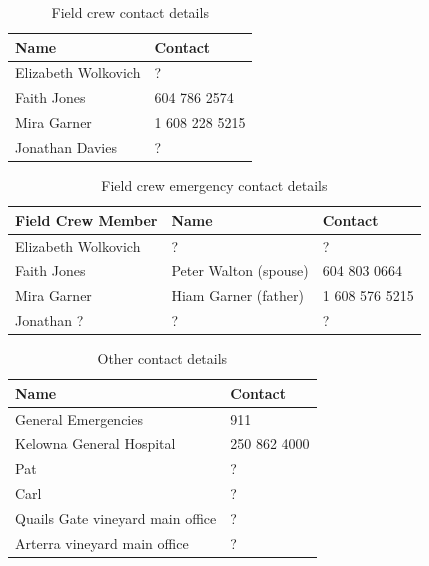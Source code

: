 \documentclass[11pt,letter]{article}
\begin{document}
\begin{table}[H]
\caption{Field crew contact details} %
\begin{tabular}{ l | l }  %
\hline\hline %
Name & Contact\\ [0.5ex] %
\hline %
Elizabeth Wolkovich & ? \\ %
Faith Jones & 604 786 2574 \\
Mira Garner & 1 608 228 5215 \\
Jonathan Davies & ? \\

\hline %
\end{tabular}
\label{table:nonlin} %
\end{table}

\begin{table}[H]
\caption{Field crew emergency contact details} %
\begin{tabular}{l l l} %
\hline\hline %
Field Crew Member & Name & Contact\\ [0.5ex] %
\hline %
Elizabeth Wolkovich & ? & ? \\ %
Faith Jones & Peter Walton (spouse) & 604 803 0664\\
Mira Garner & Hiam Garner (father) & 1 608 576 5215 \\
Jonathan ? & ? & ? \\

\hline %
\end{tabular}
\label{table:nonlin} %
\end{table}

\begin{table}[H]
\caption{Other contact details} %
\begin{tabular}{l l} %
\hline\hline %
Name & Contact \\ [0.5ex] %
\hline %
General Emergencies & 911 \\ %
Kelowna General Hospital & 250 862 4000 \\
Pat & ?\\
Carl & ?\\
Quails Gate vineyard main office & ? \\
Arterra vineyard main office & ? \\

\hline %
\end{tabular}
\label{table:nonlin} %
\end{table}
\end{document}

